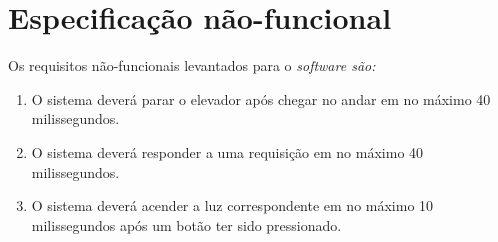 \section{Especificação não-funcional}
\label{sec:espec_nao_funcional}

Os requisitos não-funcionais levantados para o \it{software} são:

\begin{enumerate}[label=RNF \arabic*. , ref=\arabic*]
  \item O sistema deverá parar o elevador após chegar no andar em no máximo 40 milissegundos.
  \item O sistema deverá responder a uma requisição em no máximo 40 milissegundos.
  \item O sistema deverá acender a luz correspondente em no máximo 10 milissegundos após um botão ter sido pressionado.
\end{enumerate}








